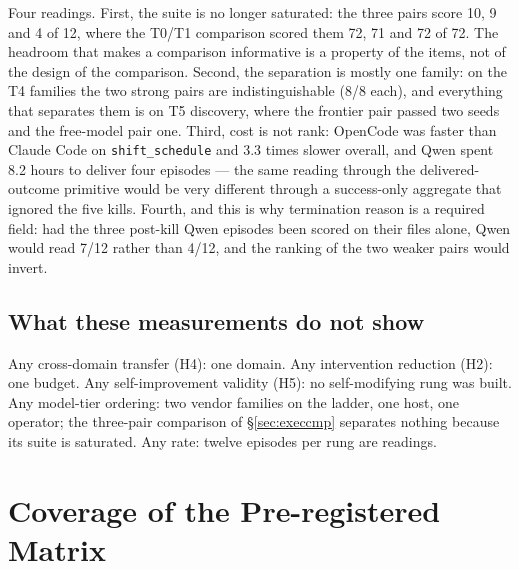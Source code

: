 Four readings. First, the suite is no longer saturated: the three pairs score 10, 9 and 4 of 12, where the T0/T1 comparison scored them 72, 71 and 72 of 72. The headroom that makes a comparison informative is a property of the items, not of the design of the comparison. Second, the separation is mostly one family: on the T4 families the two strong pairs are indistinguishable (8/8 each), and everything that separates them is on T5 discovery, where the frontier pair passed two seeds and the free-model pair one. Third, cost is not rank: OpenCode was faster than Claude Code on \texttt{shift\_schedule} and 3.3 times slower overall, and Qwen spent 8.2 hours to deliver four episodes --- the same reading through the delivered-outcome primitive would be very different through a success-only aggregate that ignored the five kills. Fourth, and this is why termination reason is a required field: had the three post-kill Qwen episodes been scored on their files alone, Qwen would read 7/12 rather than 4/12, and the ranking of the two weaker pairs would invert.

\subsection{What these measurements do not show}

Any cross-domain transfer (H4): one domain. Any intervention reduction (H2): one budget. Any self-improvement validity (H5): no self-modifying rung was built. Any model-tier ordering: two vendor families on the ladder, one host, one operator; the three-pair comparison of \S\ref{sec:execcmp} separates nothing because its suite is saturated. Any rate: twelve episodes per rung are readings.

\section{Coverage of the Pre-registered Matrix}\label{sec:coverage}

